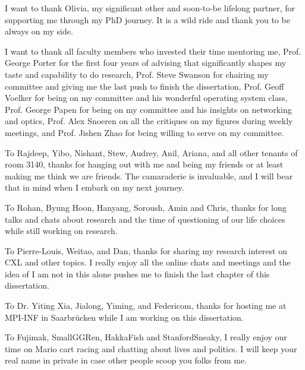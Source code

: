 \begin{frontmatter}
%
\tableofcontents
\listoffigures  %
\listoftables   %



%
%
\begin{acknowledgements}
%
I want to thank Olivia, my significant other and soon-to-be lifelong partner, for supporting me through my PhD journey.
%
It is a wild ride and thank you to be always on my side.

I want to thank all faculty members who invested their time mentoring me, 
%
Prof. George Porter for the first four years of advising that significantly shapes my taste and capability to do research, 
%
Prof. Steve Swanson for chairing my committee and giving me the last push to finish the dissertation,
%
Prof. Geoff Voelker for being on my committee and his wonderful operating system class,
%
Prof. George Papen for being on my committee and his insights on networking and optics, 
%
Prof. Alex Snoeren on all the critiques on my figures during weekly meetings, 
%
and Prof. Jishen Zhao for being willing to serve on my committee.

To Rajdeep, Yibo, Nishant, Stew, Audrey, Anil, Ariana, and all other tenants of room 3140, 
thanks for hanging out with me and being my friends or at least making me think we are friends.
%
The camaraderie is invaluable, and I will bear that in mind when I embark on my next journey.

To Rohan, Byung Hoon, Hanyang, Soroush, Amin and Chris, thanks for long talks and chats about research and the time of questioning of our life choices while still working on research.  

To Pierre-Louis, Weitao, and Dan, thanks for sharing my research interest on CXL and other topics.
%
I really enjoy all the online chats and meetings and the idea of I am not in this alone pushes me to finish the last chapter of this dissertation.

To Dr. Yiting Xia, Jialong, Yiming, and Federicom, thanks for hosting me at MPI-INF in Saarbr\"{u}cken while I am working on this dissertation. 

To Fujimak, SmallGGRen, HakkaFish and StanfordSneaky, I really enjoy our time on Mario cart racing and chatting about lives and politics. I will keep your real name in private in case other people scoop you folks from me. 


\end{acknowledgements}
\end{frontmatter}
